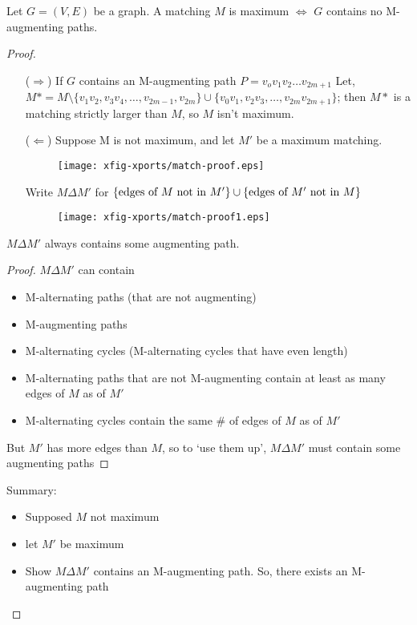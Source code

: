\documentclass{article}
\begin{document}
\begin{thm}
 Let $G=(V,E)$ be a graph.  A matching $M$ is maximum $\iff$ $G$ contains no M-augmenting paths.
\end{thm}

\begin{proof}
\begin{itemize}
 \item[($\Rightarrow$)] If $G$ contains an M-augmenting path $P=v_o v_1 v_2 \ldots v_{2m+1}$ Let, $M*=M \setminus \{v_1v_2, v_3 v_4, \ldots, v_{2m-1},v_{2m}\} \cup \{v_0 v_1, v_2 v_3, \ldots, v_{2m}v_{2m+1}\}$; then $M*$ is a matching strictly larger than $M$, so $M$ isn't maximum.
\item[($\Leftarrow$)] Suppose M is not maximum, and let $M'$ be a maximum matching.
\begin{figure}[H]
\centering
\texttt{[image: xfig-xports/match-proof.eps]}
\end{figure}

Write $M \Delta M'$ for $\{\textmd{edges of $M$ not in $M'$}\} \cup \{\textmd{edges of $M'$ not in $M$}\}$
\begin{figure}[H]
\centering
\texttt{[image: xfig-xports/match-proof1.eps]}
\end{figure}
\end{itemize}

\begin{clm}
$M \Delta M'$ always contains some augmenting path.
\end{clm}

\begin{proof}
$M \Delta M'$ can contain
\begin{itemize}
 \item M-alternating paths (that are not augmenting)
\item M-augmenting paths
\item M-alternating cycles (M-alternating cycles that have even length)
\item M-alternating paths that are not M-augmenting contain at least as many edges of $M$ as of $M'$
\item M-alternating cycles contain the same \# of edges of $M$ as of $M'$
\end{itemize}

But $M'$ has more edges than $M$, so to `use them up', $M \Delta M'$ must contain some augmenting paths
\end{proof}

Summary:
\begin{itemize}
 \item Supposed $M$ not maximum
\item let $M'$ be maximum
\item Show $M \Delta M'$ contains an M-augmenting path.  So, there exists an M-augmenting path
\end{itemize}
\end{proof}
\end{document}
